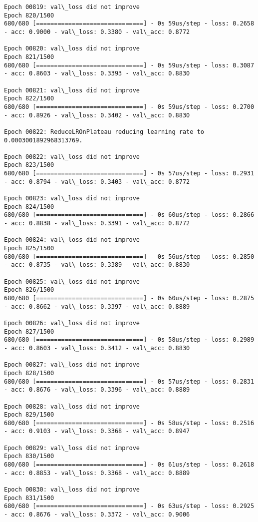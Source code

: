 \documentclass[11pt]{article}
\begin{document}
\begin{Verbatim}[commandchars=\\\{\}]
Epoch 00819: val\_loss did not improve
Epoch 820/1500
680/680 [==============================] - 0s 59us/step - loss: 0.2658 - acc: 0.9000 - val\_loss: 0.3380 - val\_acc: 0.8772

Epoch 00820: val\_loss did not improve
Epoch 821/1500
680/680 [==============================] - 0s 59us/step - loss: 0.3087 - acc: 0.8603 - val\_loss: 0.3393 - val\_acc: 0.8830

Epoch 00821: val\_loss did not improve
Epoch 822/1500
680/680 [==============================] - 0s 59us/step - loss: 0.2700 - acc: 0.8926 - val\_loss: 0.3402 - val\_acc: 0.8830

Epoch 00822: ReduceLROnPlateau reducing learning rate to 0.0003001892968313769.

Epoch 00822: val\_loss did not improve
Epoch 823/1500
680/680 [==============================] - 0s 57us/step - loss: 0.2931 - acc: 0.8794 - val\_loss: 0.3403 - val\_acc: 0.8772

Epoch 00823: val\_loss did not improve
Epoch 824/1500
680/680 [==============================] - 0s 60us/step - loss: 0.2866 - acc: 0.8838 - val\_loss: 0.3391 - val\_acc: 0.8772

Epoch 00824: val\_loss did not improve
Epoch 825/1500
680/680 [==============================] - 0s 56us/step - loss: 0.2850 - acc: 0.8735 - val\_loss: 0.3389 - val\_acc: 0.8830

Epoch 00825: val\_loss did not improve
Epoch 826/1500
680/680 [==============================] - 0s 60us/step - loss: 0.2875 - acc: 0.8662 - val\_loss: 0.3397 - val\_acc: 0.8889

Epoch 00826: val\_loss did not improve
Epoch 827/1500
680/680 [==============================] - 0s 58us/step - loss: 0.2989 - acc: 0.8603 - val\_loss: 0.3412 - val\_acc: 0.8830

Epoch 00827: val\_loss did not improve
Epoch 828/1500
680/680 [==============================] - 0s 57us/step - loss: 0.2831 - acc: 0.8676 - val\_loss: 0.3396 - val\_acc: 0.8889

Epoch 00828: val\_loss did not improve
Epoch 829/1500
680/680 [==============================] - 0s 58us/step - loss: 0.2516 - acc: 0.9103 - val\_loss: 0.3368 - val\_acc: 0.8947

Epoch 00829: val\_loss did not improve
Epoch 830/1500
680/680 [==============================] - 0s 61us/step - loss: 0.2618 - acc: 0.8853 - val\_loss: 0.3368 - val\_acc: 0.8889

Epoch 00830: val\_loss did not improve
Epoch 831/1500
680/680 [==============================] - 0s 63us/step - loss: 0.2925 - acc: 0.8676 - val\_loss: 0.3372 - val\_acc: 0.9006


\end{Verbatim}
\end{document}
